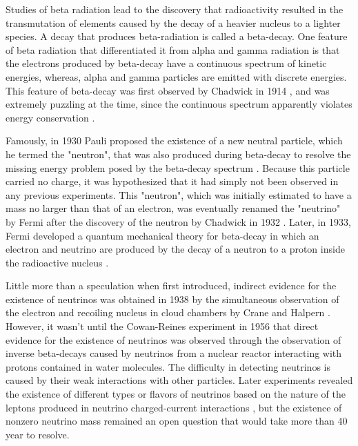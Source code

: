 Studies of beta radiation lead to the discovery that radioactivity resulted in the transmutation of elements \cite{rutherford_transmutation} caused by the decay of a heavier nucleus to a lighter species. A decay that produces beta-radiation is called a beta-decay. One feature of beta radiation that differentiated it from alpha and gamma radiation is that the electrons produced by beta-decay have a continuous spectrum of kinetic energies, whereas, alpha and gamma particles are emitted with discrete energies. This feature of beta-decay was first observed by Chadwick in 1914 \cite{chadwick1914}, and was extremely puzzling at the time, since the continuous spectrum apparently violates energy conservation \cite{bohr_energy_nonconservation_ref}. 

Famously, in 1930 Pauli proposed the existence of a new neutral particle, which he termed the "neutron", that was also produced during beta-decay to resolve the missing energy problem posed by the beta-decay spectrum \cite{Pauli:1930pc}. Because this particle carried no charge, it was hypothesized that it had simply not been observed in any previous experiments. This "neutron", which was initially estimated to have a mass no larger than that of an electron, was eventually renamed the "neutrino" by Fermi \cite{fermi_rename} after the discovery of the neutron by Chadwick in 1932 \cite{neutron}. Later, in 1933, Fermi developed a quantum mechanical theory for beta-decay in which an electron and neutrino are produced by the decay of a neutron to a proton inside the radioactive nucleus \cite{fermi_beta_decay}.

Little more than a speculation when first introduced, indirect evidence for the existence of neutrinos was obtained in 1938 by the simultaneous observation of the electron and recoiling nucleus in cloud chambers by Crane and Halpern \cite{crane_halpern}. However, it wasn't until the Cowan-Reines experiment \cite{cowan_reines} in 1956 that direct evidence for the existence of neutrinos was observed through the observation of inverse beta-decays caused by neutrinos from a nuclear reactor interacting with protons contained in water molecules. The difficulty in detecting neutrinos is caused by their weak interactions with other particles. Later experiments revealed the existence of different types or flavors of neutrinos based on the nature of the leptons produced in neutrino charged-current interactions \cite{neutrino_flavor}, but the existence of nonzero neutrino mass remained an open question that would take more than 40 year to resolve.

